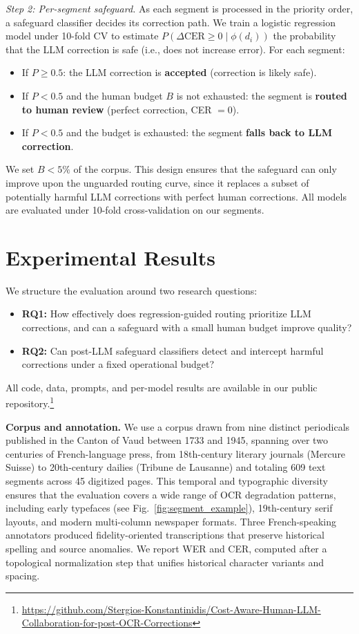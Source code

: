 \documentclass[sigconf]{acmart}
\begin{document}
\smallskip\noindent\emph{Step 2: Per-segment safeguard.}
As each segment is processed in the priority order, a safeguard classifier decides its correction path. We train a logistic regression model under 10-fold CV to estimate $P(\Delta\text{CER} \geq 0 \mid \phi(d_i))$ the probability that the LLM correction is safe (i.e., does not increase error). For each segment:
\begin{itemize}
    \item If $P \geq 0.5$: the LLM correction is \textbf{accepted} (correction is likely safe).
    \item If $P < 0.5$ and the human budget $B$ is not exhausted: the segment is \textbf{routed to human review} (perfect correction, CER $= 0$).
    \item If $P < 0.5$ and the budget is exhausted: the segment \textbf{falls back to LLM correction}.
\end{itemize}
We set $B <5 \%$ of the corpus. This design ensures that the safeguard can only improve upon the unguarded routing curve, since it replaces a subset of potentially harmful LLM corrections with perfect human corrections. All models are evaluated under 10-fold cross-validation on our segments.

\section{Experimental Results}
\label{sec:experiments}

We structure the evaluation around two research questions:
\begin{itemize}
    \item \textbf{RQ1:} How effectively does regression-guided routing prioritize LLM corrections, and can a safeguard with a small human budget improve quality?
    \item \textbf{RQ2:} Can post-LLM safeguard classifiers detect and intercept harmful corrections under a fixed operational budget?
\end{itemize}
All code, data, prompts, and per-model results are available in our public
repository.\footnote{\url{https://github.com/Stergios-Konstantinidis/Cost-Aware-Human-LLM-Collaboration-for-post-OCR-Corrections}}


\medskip\noindent\textbf{Corpus and annotation.}
We use a corpus drawn from nine distinct periodicals published in the Canton of Vaud between 1733 and 1945, spanning over two centuries of French-language press, from 18th-century literary journals (Mercure Suisse) to 20th-century dailies (Tribune de Lausanne) and totaling 609 text segments across 45 digitized pages. This temporal and typographic diversity ensures that the evaluation covers a wide range of OCR degradation patterns, including early typefaces (see Fig.~\ref{fig:segment_example}), 19th-century serif layouts, and modern multi-column newspaper formats. Three French-speaking annotators produced fidelity-oriented
transcriptions that preserve historical spelling and source anomalies. We report
WER and CER, computed after a topological normalization step that unifies
historical character variants and spacing.
\end{document}
